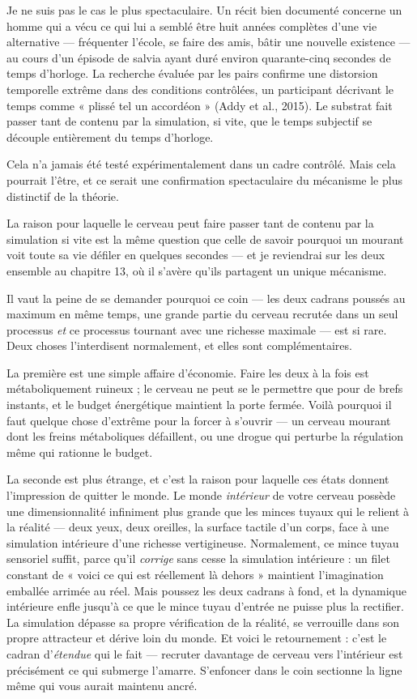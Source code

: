 \documentclass[11pt, twoside, openright]{book}
\begin{document}
Je ne suis pas le cas le plus spectaculaire. Un récit bien documenté concerne un homme qui a vécu ce qui lui a semblé être huit années complètes d'une vie alternative --- fréquenter l'école, se faire des amis, bâtir une nouvelle existence --- au cours d'un épisode de salvia ayant duré environ quarante-cinq secondes de temps d'horloge. La recherche évaluée par les pairs confirme une distorsion temporelle extrême dans des conditions contrôlées, un participant décrivant le temps comme « plissé tel un accordéon » (Addy et al., 2015). Le substrat fait passer tant de contenu par la simulation, si vite, que le temps subjectif se découple entièrement du temps d'horloge.

Cela n'a jamais été testé expérimentalement dans un cadre contrôlé. Mais cela pourrait l'être, et ce serait une confirmation spectaculaire du mécanisme le plus distinctif de la théorie.

La raison pour laquelle le cerveau peut faire passer tant de contenu par la simulation si vite est la même question que celle de savoir pourquoi un mourant voit toute sa vie défiler en quelques secondes --- et je reviendrai sur les deux ensemble au chapitre 13, où il s'avère qu'ils partagent un unique mécanisme.

Il vaut la peine de se demander pourquoi ce coin --- les deux cadrans poussés au maximum en même temps, une grande partie du cerveau recrutée dans un seul processus \textit{et} ce processus tournant avec une richesse maximale --- est si rare. Deux choses l'interdisent normalement, et elles sont complémentaires.

La première est une simple affaire d'économie. Faire les deux à la fois est métaboliquement ruineux ; le cerveau ne peut se le permettre que pour de brefs instants, et le budget énergétique maintient la porte fermée. Voilà pourquoi il faut quelque chose d'extrême pour la forcer à s'ouvrir --- un cerveau mourant dont les freins métaboliques défaillent, ou une drogue qui perturbe la régulation même qui rationne le budget.

La seconde est plus étrange, et c'est la raison pour laquelle ces états donnent l'impression de quitter le monde. Le monde \textit{intérieur} de votre cerveau possède une dimensionnalité infiniment plus grande que les minces tuyaux qui le relient à la réalité --- deux yeux, deux oreilles, la surface tactile d'un corps, face à une simulation intérieure d'une richesse vertigineuse. Normalement, ce mince tuyau sensoriel suffit, parce qu'il \textit{corrige} sans cesse la simulation intérieure : un filet constant de « voici ce qui est réellement là dehors » maintient l'imagination emballée arrimée au réel. Mais poussez les deux cadrans à fond, et la dynamique intérieure enfle jusqu'à ce que le mince tuyau d'entrée ne puisse plus la rectifier. La simulation dépasse sa propre vérification de la réalité, se verrouille dans son propre attracteur et dérive loin du monde. Et voici le retournement : c'est le cadran d'\textit{étendue} qui le fait --- recruter davantage de cerveau vers l'intérieur est précisément ce qui submerge l'amarre. S'enfoncer dans le coin sectionne la ligne même qui vous aurait maintenu ancré.
\end{document}

